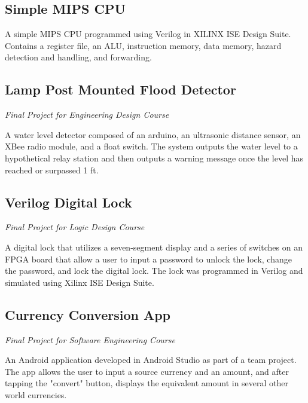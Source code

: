 \documentclass{article}
\begin{document}
\subsection{Simple MIPS CPU} 

A simple MIPS CPU programmed using Verilog in XILINX ISE Design Suite. Contains a register file, an ALU, instruction memory, data memory, hazard detection and handling, and forwarding.
\vspace{-.75em}
\subsection{Lamp Post Mounted Flood Detector} \textit{Final Project for Engineering Design Course}

A water level detector composed of an arduino, an ultrasonic distance sensor, an XBee radio module, and a float switch. The system outputs the water level to a hypothetical relay station and then outputs a warning message once the level has reached or surpassed 1 ft.
\vspace{-.75em}
\subsection{Verilog Digital Lock} \textit{Final Project for Logic Design Course}

A digital lock that utilizes a seven-segment display and a series of switches on an FPGA board that allow a user to input a password to unlock the lock, change the password, and lock the digital lock. The lock was programmed in Verilog and simulated using Xilinx ISE Design Suite.
\vspace{-.75em}
\subsection{Currency Conversion App} \textit{Final Project for Software Engineering Course}

An Android application developed in Android Studio as part of a team project. The app allows the user to input a source currency and an amount, and after tapping the "convert" button, displays the equivalent amount in several other world currencies.
\end{document}
